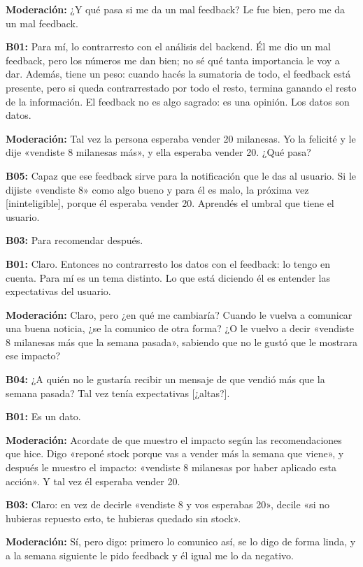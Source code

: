 \noindent\textbf{Moderación:} ¿Y qué pasa si me da un mal feedback? Le fue bien, pero me da un mal feedback.

\noindent\textbf{B01:} Para mí, lo contrarresto con el análisis del backend. Él me dio un mal feedback, pero los números me dan bien; no sé qué tanta importancia le voy a dar. Además, tiene un peso: cuando hacés la sumatoria de todo, el feedback está presente, pero si queda contrarrestado por todo el resto, termina ganando el resto de la información. El feedback no es algo sagrado: es una opinión. Los datos son datos.

\noindent\textbf{Moderación:} Tal vez la persona esperaba vender 20 milanesas. Yo la felicité y le dije «vendiste 8 milanesas más», y ella esperaba vender 20. ¿Qué pasa?

\noindent\textbf{B05:} Capaz que ese feedback sirve para la notificación que le das al usuario. Si le dijiste «vendiste 8» como algo bueno y para él es malo, la próxima vez [ininteligible], porque él esperaba vender 20. Aprendés el umbral que tiene el usuario.

\noindent\textbf{B03:} Para recomendar después.

\noindent\textbf{B01:} Claro. Entonces no contrarresto los datos con el feedback: lo tengo en cuenta. Para mí es un tema distinto. Lo que está diciendo él es entender las expectativas del usuario.

\noindent\textbf{Moderación:} Claro, pero ¿en qué me cambiaría? Cuando le vuelva a comunicar una buena noticia, ¿se la comunico de otra forma? ¿O le vuelvo a decir «vendiste 8 milanesas más que la semana pasada», sabiendo que no le gustó que le mostrara ese impacto?

\noindent\textbf{B04:} ¿A quién no le gustaría recibir un mensaje de que vendió más que la semana pasada? Tal vez tenía expectativas [¿altas?].

\noindent\textbf{B01:} Es un dato.

\noindent\textbf{Moderación:} Acordate de que muestro el impacto según las recomendaciones que hice. Digo «reponé stock porque vas a vender más la semana que viene», y después le muestro el impacto: «vendiste 8 milanesas por haber aplicado esta acción». Y tal vez él esperaba vender 20.

\noindent\textbf{B03:} Claro: en vez de decirle «vendiste 8 y vos esperabas 20», decile «si no hubieras repuesto esto, te hubieras quedado sin stock».

\noindent\textbf{Moderación:} Sí, pero digo: primero lo comunico así, se lo digo de forma linda, y a la semana siguiente le pido feedback y él igual me lo da negativo.

